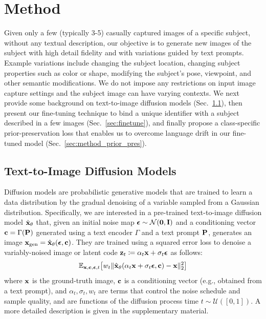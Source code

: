\section{Method}
\label{sec:method}

Given only a few (typically 3-5) casually captured images of a specific subject, without any textual description, our objective is to generate new images of the subject with high detail fidelity and with variations guided by text prompts. Example variations include changing the subject location, changing subject properties such as color or shape, modifying the subject's pose, viewpoint, and other semantic modifications. We do not impose any restrictions on input image capture settings and the subject image can have varying contexts. We next provide some background on text-to-image diffusion models (Sec.~\ref{sec:t2i}), then present our fine-tuning technique to bind a unique identifier with a subject described in a few images (Sec.~\ref{sec:finetune}), and finally propose a class-specific prior-preservation loss that enables us to overcome language drift in our fine-tuned model (Sec.~\ref{sec:method_prior_pres}).

\subsection{Text-to-Image Diffusion Models}
\label{sec:t2i}
Diffusion models are probabilistic generative models that are trained to learn a data distribution by the gradual denoising of a variable sampled from a Gaussian distribution. Specifically, we are interested in a pre-trained text-to-image diffusion model $\hat{\mathbf{x}}_\theta$ that, given an initial noise map ${\boldsymbol{\epsilon}} \sim \mathcal{N}(\mathbf{0}, \mathbf{I})$ and a conditioning vector $\mathbf{c}=\Gamma(\mathbf{P})$ generated using a text encoder $\Gamma$ and a text prompt $\mathbf{P}$, generates an image $\mathbf{x}_{\text{gen}}=\hat{\mathbf{x}}_\theta({\boldsymbol{\epsilon}}, \mathbf{c})$. They are trained using a squared error loss to denoise a variably-noised image or latent code $\mathbf{z}_t \coloneqq \alpha_t \mathbf{x} + \sigma_t {\boldsymbol{\epsilon}}$ as follows:
\begin{equation}
\label{eq:diffusion}
    \mathbb{E}_{\mathbf{x},\mathbf{c},{\boldsymbol{\epsilon}},t}\!\left[w_t \|\hat{\mathbf{x}}_\theta(\alpha_t \mathbf{x} + \sigma_t {\boldsymbol{\epsilon}}, \mathbf{c}) - \mathbf{x} \|^2_2\right]
\end{equation}
where $\mathbf{x}$ is the ground-truth image, $\mathbf{c}$ is a conditioning vector (e.g., obtained from a text prompt), and $\alpha_t, \sigma_t, w_t$ are terms that control the noise schedule and sample quality, and are functions of the diffusion process time $t \sim \mathcal{U}([0, 1])$. 
A more detailed description is given in the supplementary material.  

